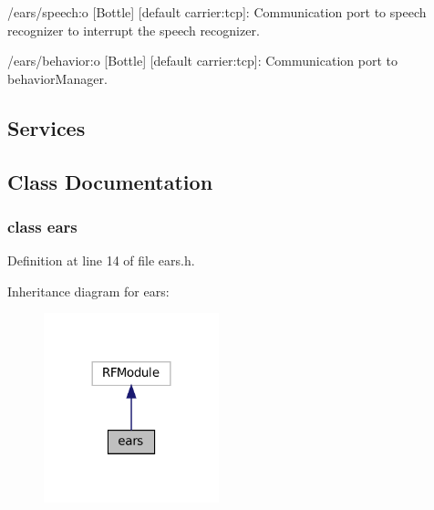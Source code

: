 \begin{DoxyItemize}
\item /ears/speech\+:o \mbox{[}Bottle\mbox{]} \mbox{[}default carrier\+:tcp\mbox{]}\+: Communication port to speech recognizer to interrupt the speech recognizer.
\item /ears/behavior\+:o \mbox{[}Bottle\mbox{]} \mbox{[}default carrier\+:tcp\mbox{]}\+: Communication port to behavior\+Manager.
\end{DoxyItemize}\hypertarget{group__touchDetector_services_sec}{}\subsection{Services}\label{group__touchDetector_services_sec}


\subsection{Class Documentation}
\label{classears}
\subsubsection{class ears}


Definition at line 14 of file ears.\+h.



Inheritance diagram for ears\+:
\nopagebreak
\begin{figure}[H]
\begin{center}
\leavevmode
\includegraphics[width=144pt]{classears__inherit__graph}
\end{center}
\end{figure}
